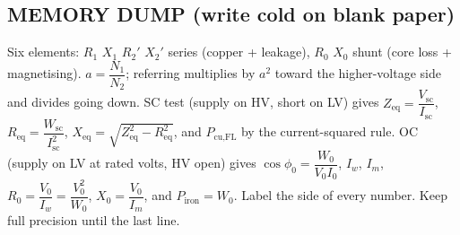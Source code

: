 \documentclass[11pt]{article}
\begin{document}
\subsection*{\color{copper}MEMORY DUMP (write cold on blank paper)}
Six elements: $R_1$ $X_1$ $R_2'$ $X_2'$ series (copper + leakage), $R_0$ $X_0$ shunt (core loss + magnetising). $a = \dfrac{N_1}{N_2}$; referring multiplies by $a^{2}$ toward the higher-voltage side and divides going down. SC test (supply on HV, short on LV) gives $Z_{\text{eq}} = \dfrac{V_{\text{sc}}}{I_{\text{sc}}}$, $R_{\text{eq}} = \dfrac{W_{\text{sc}}}{I_{\text{sc}}^{2}}$, $X_{\text{eq}} = \sqrt{Z_{\text{eq}}^{2} - R_{\text{eq}}^{2}}$, and $P_{\text{cu,FL}}$ by the current-squared rule. OC (supply on LV at rated volts, HV open) gives $\cos\phi_0 = \dfrac{W_0}{V_0 I_0}$, $I_w$, $I_m$, $R_0 = \dfrac{V_0}{I_w} = \dfrac{V_0^{2}}{W_0}$, $X_0 = \dfrac{V_0}{I_m}$, and $P_{\text{iron}} = W_0$. Label the side of every number. Keep full precision until the last line.
\end{document}
